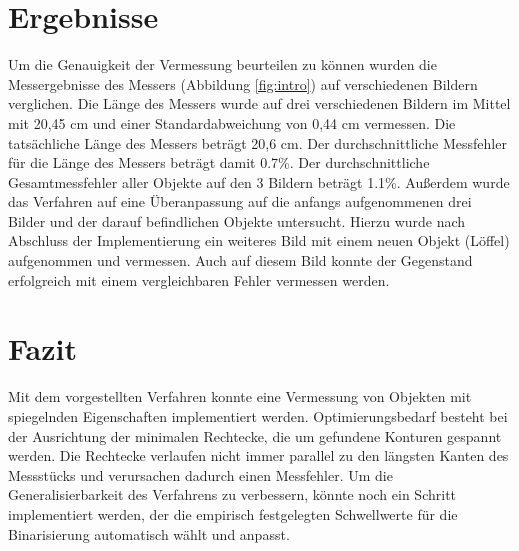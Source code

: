 \documentclass[twocolumn,10pt]{asme2ej}
\begin{document}
\section{Ergebnisse}
Um die Genauigkeit der Vermessung beurteilen zu können wurden die Messergebnisse des Messers (Abbildung \ref{fig:intro}) auf verschiedenen Bildern verglichen. Die Länge des Messers wurde auf drei verschiedenen Bildern im Mittel mit 20,45 cm und einer Standardabweichung von 0,44 cm vermessen. Die tatsächliche Länge des Messers beträgt 20,6 cm. Der durchschnittliche Messfehler für die Länge des Messers beträgt damit 0.7\%. Der durchschnittliche Gesamtmessfehler aller Objekte auf den 3 Bildern beträgt 1.1\%.
Außerdem wurde das Verfahren auf eine Überanpassung auf die anfangs aufgenommenen drei Bilder und der darauf befindlichen Objekte untersucht. Hierzu wurde nach Abschluss der Implementierung ein weiteres Bild mit einem neuen Objekt (Löffel) aufgenommen und vermessen. Auch auf diesem Bild konnte der Gegenstand erfolgreich mit einem vergleichbaren Fehler vermessen werden.

\section{Fazit}
Mit dem vorgestellten Verfahren konnte eine Vermessung von Objekten mit spiegelnden Eigenschaften implementiert werden. Optimierungsbedarf besteht bei der Ausrichtung der minimalen Rechtecke, die um gefundene Konturen gespannt werden. Die Rechtecke verlaufen nicht immer parallel zu den längsten Kanten des Messstücks und verursachen dadurch einen Messfehler. Um die Generalisierbarkeit des Verfahrens zu verbessern, könnte noch ein Schritt implementiert werden, der die empirisch festgelegten Schwellwerte für die Binarisierung automatisch wählt und anpasst.




\end{document}

